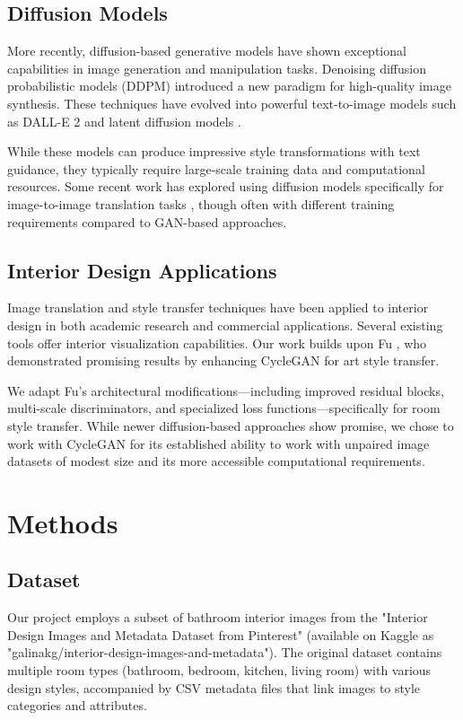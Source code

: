 \documentclass[twocolumn,superscriptaddress,aps]{revtex4-1}
\begin{document}
\subsection{Diffusion Models}
More recently, diffusion-based generative models have shown exceptional capabilities in image generation and manipulation tasks. Denoising diffusion probabilistic models (DDPM) \cite{ho2020denoising} introduced a new paradigm for high-quality image synthesis. These techniques have evolved into powerful text-to-image models such as DALL-E 2 \cite{ramesh2022hierarchical} and latent diffusion models \cite{rombach2022high}. 

While these models can produce impressive style transformations with text guidance, they typically require large-scale training data and computational resources. Some recent work has explored using diffusion models specifically for image-to-image translation tasks \cite{saharia2022palette}, though often with different training requirements compared to GAN-based approaches.

\subsection{Interior Design Applications}
Image translation and style transfer techniques have been applied to interior design in both academic research and commercial applications. Several existing tools offer interior visualization capabilities. Our work builds upon Fu \cite{fu2022digital}, who demonstrated promising results by enhancing CycleGAN for art style transfer. 

We adapt Fu's architectural modifications—including improved residual blocks, multi-scale discriminators, and specialized loss functions—specifically for room style transfer. While newer diffusion-based approaches show promise, we chose to work with CycleGAN for its established ability to work with unpaired image datasets of modest size and its more accessible computational requirements.

\section{Methods}

\subsection{Dataset}

Our project employs a subset of bathroom interior images from the "Interior Design Images and Metadata Dataset from Pinterest" (available on Kaggle as "galinakg/interior-design-images-and-metadata"). The original dataset contains multiple room types (bathroom, bedroom, kitchen, living room) with various design styles, accompanied by CSV metadata files that link images to style categories and attributes.
\end{document}
